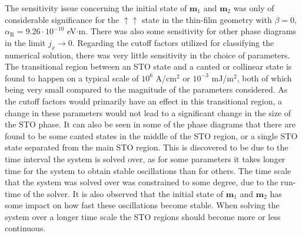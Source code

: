 The sensitivity issue concerning the initial state of $\mathbold{m}_1$ and $\mathbold{m}_2$ was only of considerable significance for the $\uparrow\uparrow$ state in the thin-film geometry with $\beta = 0$, $\alpha_\text{R} = 9.26\cdot10^{-10}$ eV$\cdot$m. There was also some sensitivity for other phase diagrams in the limit $j_x\rightarrow 0$. Regarding the cutoff factors utilized for classifying the numerical solution, there was very little sensitivity in the choice of parameters. The transitional region between an STO state and a canted or collinear state is found to happen on a typical scale of $10^{6}$ A/cm$^2$ or $10^{-3}$ mJ/m$^2$, both of which being very small compared to the magnitude of the parameters considered. As the cutoff factors would primarily have an effect in this transitional region, a change in these parameters would not lead to a significant change in the size of the STO phase. It can also be seen in some of the phase diagrams that there are found to be some canted states in the middle of the STO region, or a single STO state separated from the main STO region. This is discovered to be due to the time interval the system is solved over, as for some parameters it takes longer time for the system to obtain stable oscillations than for others. The time scale that the system was solved over was constrained to some degree, due to the run-time of the solver. It is also observed that the initial state of $\mathbold{m}_1$ and $\mathbold{m}_2$ has some impact on how fast these oscillations become stable. When solving the system over a longer time scale the STO regions should become more or less continuous.

